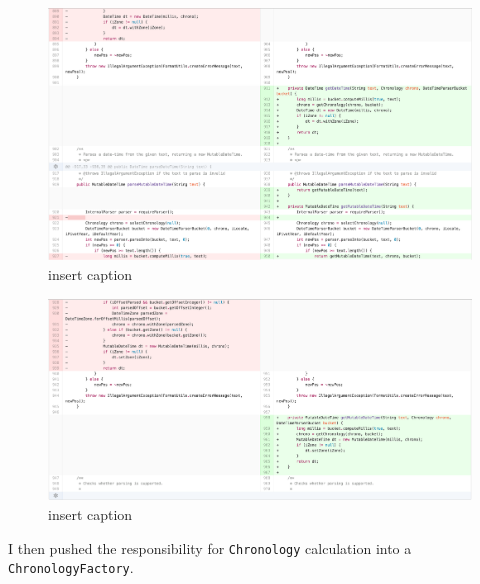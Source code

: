\begin{figure}[H]
	\centering
	\includegraphics[width=\linewidth]{code40}
	\caption{insert caption}
\end{figure}
\begin{figure}[H]
	\centering
	\includegraphics[width=\linewidth]{code41}
	\caption{insert caption}
\end{figure}

I then pushed the responsibility for \texttt{Chronology} calculation into a \texttt{ChronologyFactory}.

